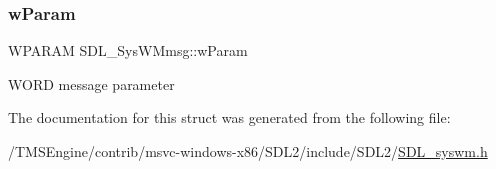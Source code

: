 \mbox{\label{struct_s_d_l___sys_w_mmsg_a7463730478d90ebc031d83098f3f74fc}} 
\subsubsection{\texorpdfstring{w\+Param}{wParam}}
{\footnotesize\ttfamily W\+P\+A\+R\+AM S\+D\+L\+\_\+\+Sys\+W\+Mmsg\+::w\+Param}

W\+O\+RD message parameter 

The documentation for this struct was generated from the following file\+:\begin{DoxyCompactItemize}
\item 
/\+T\+M\+S\+Engine/contrib/msvc-\/windows-\/x86/\+S\+D\+L2/include/\+S\+D\+L2/\hyperlink{_s_d_l__syswm_8h}{S\+D\+L\+\_\+syswm.\+h}\end{DoxyCompactItemize}
